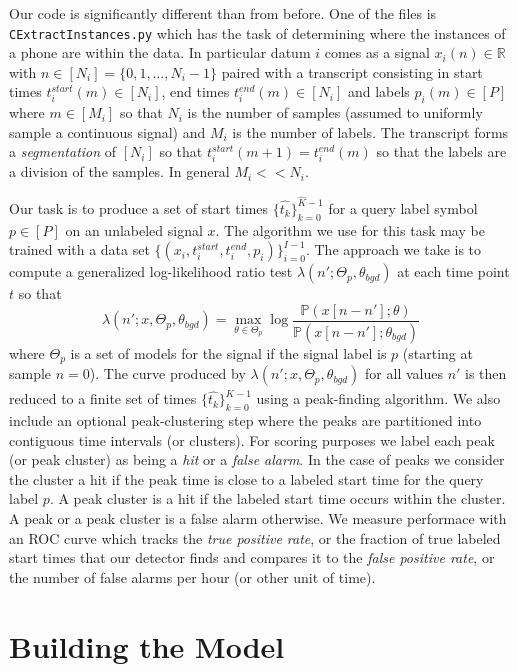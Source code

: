 \documentclass{article}
\begin{document}
Our code is significantly different than from before.  One of the files is \texttt{CExtractInstances.py}
which has the task of determining where the instances of a phone are within the data. In particular datum $i$ comes as 
a signal $x_i(n)\in\mathbb{R}$ with $n\in[N_i]=\{0,1,\ldots,N_i-1\}$ paired with a transcript consisting in start times $t_i^{start}(m)\in[N_i]$,
end times $t_i^{end}(m)\in[N_i]$ and labels $p_i(m)\in [P]$ where $m\in[M_i]$ so that $N_i$ is the number of samples (assumed to 
uniformly sample a continuous signal) and $M_i$ is the number of labels.  The transcript forms a \textit{segmentation} of
$[N_i]$ so that $t_i^{start}(m+1)=t_i^{end}(m)$ so that the labels are a division of the samples.  In general $M_i << N_i$.

Our task is to produce a set of start times $\{\hat{t_k}\}_{k=0}^{\hat{K}-1}$ for a query label symbol $p\in[P]$ on an unlabeled
signal $x$.  The algorithm we use for this task may be trained with a data set $\{(x_i,t_i^{start},t_i^{end},p_i)\}_{i=0}^{I-1}$.  The 
approach we take is to compute a generalized log-likelihood ratio test $\lambda(n';\Theta_p,\theta_{bgd})$ at each time point
$t$ so that
\begin{equation}
  \lambda(n';x,\Theta_p,\theta_{bgd}) = \max_{\theta\in\Theta_p}\log\frac{\mathbb{P}(x[n-n'];\theta)}{\mathbb{P}(x[n-n'];\theta_{bgd})}
\end{equation}
where $\Theta_p$ is a set of models for the signal if the signal label is $p$ (starting at sample $n=0$).
The curve produced by $\lambda(n'; x,\Theta_p,\theta_{bgd})$ for all values $n'$ is then reduced to a finite set of times $\{\hat{t_k}\}_{k=0}^{\hat{K}-1}$ using a peak-finding algorithm.  We also include an optional peak-clustering step where the peaks are partitioned
into contiguous time intervals (or clusters).  For scoring purposes we label each peak (or peak cluster) as being a \textit{hit}
or a \textit{false alarm}.  In the case of peaks we consider the cluster a hit if the peak time is close to a labeled start time
for the query label $p$. A peak cluster is a hit if the labeled start time occurs within the cluster.  A peak or a peak cluster
is a false alarm otherwise.  We measure performace with an ROC curve which tracks the \textit{true positive rate}, or the fraction of
true labeled start times that our detector finds and compares it to the \textit{false positive rate}, or the number of false alarms
per hour (or other unit of time).

\section{Building the Model}
\end{document}
